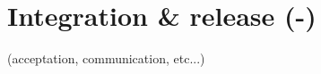 
\section{Integration \& release (-)}
\label{sec:integration-release}
(acceptation, communication, etc...)
